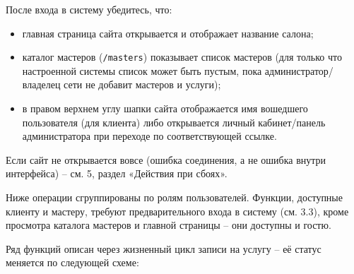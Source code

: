После входа в систему убедитесь, что:
\begin{itemize}
  \item главная страница сайта открывается и отображает название салона;
  \item каталог мастеров (\texttt{/masters}) показывает список мастеров
        (для только что настроенной системы список может быть пустым,
        пока администратор/владелец сети не добавит мастеров и услуги);
  \item в правом верхнем углу шапки сайта отображается имя вошедшего
        пользователя (для клиента) либо открывается личный кабинет/панель
        администратора при переходе по соответствующей ссылке.
\end{itemize}
Если сайт не открывается вовсе (ошибка соединения, а не ошибка внутри
интерфейса) -- см. 5, раздел «Действия при сбоях».


Ниже операции сгруппированы по ролям пользователей. Функции, доступные
клиенту и мастеру, требуют предварительного входа в систему (см. 3.3),
кроме просмотра каталога мастеров и главной страницы -- они доступны и
гостю.

Ряд функций описан через жизненный цикл записи на услугу -- её статус
меняется по следующей схеме:

\begin{center}
\end{center}

